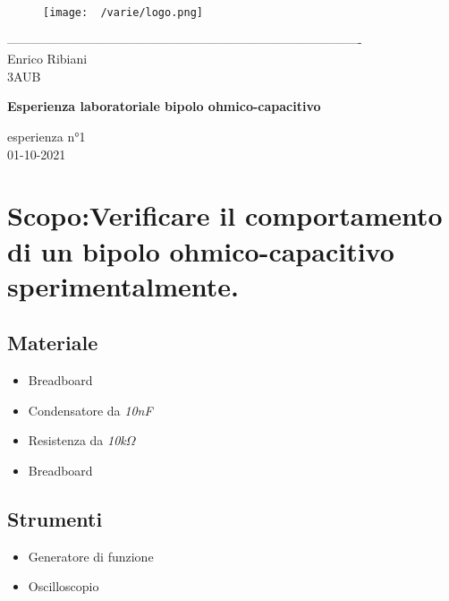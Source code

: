 \documentclass[12pt]{article}
\begin{document}
    \begin{titlepage}
    \begin{center}
\begin{figure}
    \centering
    \texttt{[image: ~/varie/logo.png]}
    \label{fig:logo}
\end{figure}
-------------------------------------------------------------------------------------\\
\vspace{2\baselineskip}
\large Enrico Ribiani\\
\large 3AUB\\
\vfill

\Huge{\textbf{Esperienza laboratoriale bipolo ohmico-capacitivo}}\\
\vfill

\LARGE{esperienza n°1}\\
\vfill
\large{01-10-2021}
\end{center}
\end{titlepage}
\tableofcontents
\vskip 1cm
\section{Scopo:Verificare il comportamento di un bipolo ohmico-capacitivo sperimentalmente.}
    \subsection{Materiale}
    \begin{itemize}
        \item Breadboard
        \item Condensatore da \textit{10nF}
        \item Resistenza da \textit{10k$\Omega$}
        \item Breadboard
    \end{itemize}
    \subsection{Strumenti}
    \begin{itemize}
        \item Generatore di funzione
        \item Oscilloscopio
    \end{itemize}
\end{document}
